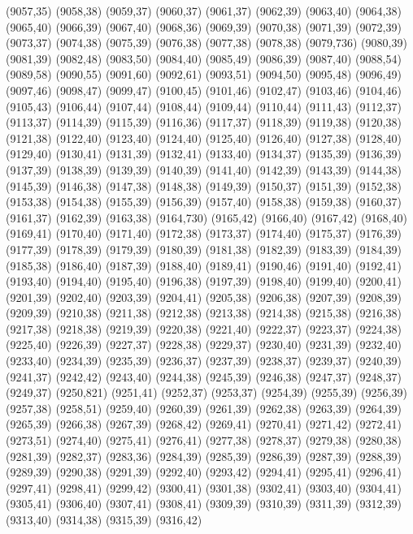 (9057,35)
(9058,38)
(9059,37)
(9060,37)
(9061,37)
(9062,39)
(9063,40)
(9064,38)
(9065,40)
(9066,39)
(9067,40)
(9068,36)
(9069,39)
(9070,38)
(9071,39)
(9072,39)
(9073,37)
(9074,38)
(9075,39)
(9076,38)
(9077,38)
(9078,38)
(9079,736)
(9080,39)
(9081,39)
(9082,48)
(9083,50)
(9084,40)
(9085,49)
(9086,39)
(9087,40)
(9088,54)
(9089,58)
(9090,55)
(9091,60)
(9092,61)
(9093,51)
(9094,50)
(9095,48)
(9096,49)
(9097,46)
(9098,47)
(9099,47)
(9100,45)
(9101,46)
(9102,47)
(9103,46)
(9104,46)
(9105,43)
(9106,44)
(9107,44)
(9108,44)
(9109,44)
(9110,44)
(9111,43)
(9112,37)
(9113,37)
(9114,39)
(9115,39)
(9116,36)
(9117,37)
(9118,39)
(9119,38)
(9120,38)
(9121,38)
(9122,40)
(9123,40)
(9124,40)
(9125,40)
(9126,40)
(9127,38)
(9128,40)
(9129,40)
(9130,41)
(9131,39)
(9132,41)
(9133,40)
(9134,37)
(9135,39)
(9136,39)
(9137,39)
(9138,39)
(9139,39)
(9140,39)
(9141,40)
(9142,39)
(9143,39)
(9144,38)
(9145,39)
(9146,38)
(9147,38)
(9148,38)
(9149,39)
(9150,37)
(9151,39)
(9152,38)
(9153,38)
(9154,38)
(9155,39)
(9156,39)
(9157,40)
(9158,38)
(9159,38)
(9160,37)
(9161,37)
(9162,39)
(9163,38)
(9164,730)
(9165,42)
(9166,40)
(9167,42)
(9168,40)
(9169,41)
(9170,40)
(9171,40)
(9172,38)
(9173,37)
(9174,40)
(9175,37)
(9176,39)
(9177,39)
(9178,39)
(9179,39)
(9180,39)
(9181,38)
(9182,39)
(9183,39)
(9184,39)
(9185,38)
(9186,40)
(9187,39)
(9188,40)
(9189,41)
(9190,46)
(9191,40)
(9192,41)
(9193,40)
(9194,40)
(9195,40)
(9196,38)
(9197,39)
(9198,40)
(9199,40)
(9200,41)
(9201,39)
(9202,40)
(9203,39)
(9204,41)
(9205,38)
(9206,38)
(9207,39)
(9208,39)
(9209,39)
(9210,38)
(9211,38)
(9212,38)
(9213,38)
(9214,38)
(9215,38)
(9216,38)
(9217,38)
(9218,38)
(9219,39)
(9220,38)
(9221,40)
(9222,37)
(9223,37)
(9224,38)
(9225,40)
(9226,39)
(9227,37)
(9228,38)
(9229,37)
(9230,40)
(9231,39)
(9232,40)
(9233,40)
(9234,39)
(9235,39)
(9236,37)
(9237,39)
(9238,37)
(9239,37)
(9240,39)
(9241,37)
(9242,42)
(9243,40)
(9244,38)
(9245,39)
(9246,38)
(9247,37)
(9248,37)
(9249,37)
(9250,821)
(9251,41)
(9252,37)
(9253,37)
(9254,39)
(9255,39)
(9256,39)
(9257,38)
(9258,51)
(9259,40)
(9260,39)
(9261,39)
(9262,38)
(9263,39)
(9264,39)
(9265,39)
(9266,38)
(9267,39)
(9268,42)
(9269,41)
(9270,41)
(9271,42)
(9272,41)
(9273,51)
(9274,40)
(9275,41)
(9276,41)
(9277,38)
(9278,37)
(9279,38)
(9280,38)
(9281,39)
(9282,37)
(9283,36)
(9284,39)
(9285,39)
(9286,39)
(9287,39)
(9288,39)
(9289,39)
(9290,38)
(9291,39)
(9292,40)
(9293,42)
(9294,41)
(9295,41)
(9296,41)
(9297,41)
(9298,41)
(9299,42)
(9300,41)
(9301,38)
(9302,41)
(9303,40)
(9304,41)
(9305,41)
(9306,40)
(9307,41)
(9308,41)
(9309,39)
(9310,39)
(9311,39)
(9312,39)
(9313,40)
(9314,38)
(9315,39)
(9316,42)
